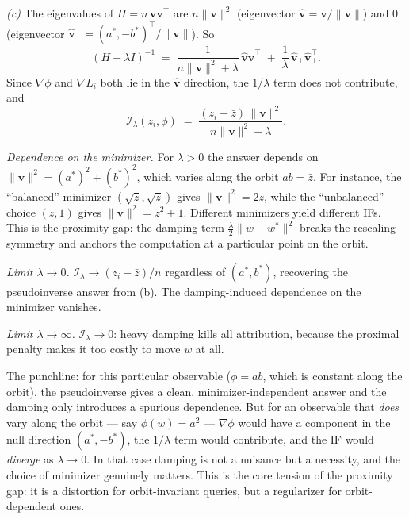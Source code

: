\begin{solution}[ex:if-degenerate]
\textit{(c)} The eigenvalues of $H = n\,\mathbf{v}\mathbf{v}^\top$ are $n\|\mathbf{v}\|^2$ (eigenvector $\hat{\mathbf{v}} = \mathbf{v}/\|\mathbf{v}\|$) and $0$ (eigenvector $\hat{\mathbf{v}}_\perp = (a^*,-b^*)^\top/\|\mathbf{v}\|$). So
\[
  (H+\lambda I)^{-1}
  \;=\; \frac{1}{n\|\mathbf{v}\|^2+\lambda}\,\hat{\mathbf{v}}\hat{\mathbf{v}}^\top
  \;+\; \frac{1}{\lambda}\,\hat{\mathbf{v}}_\perp\hat{\mathbf{v}}_\perp^\top.
\]
Since $\nabla\phi$ and $\nabla L_i$ both lie in the $\hat{\mathbf{v}}$ direction, the $1/\lambda$ term does not contribute, and
\[
  \mathcal{I}_\lambda(z_i,\phi) \;=\; \frac{(z_i-\bar z)\,\|\mathbf{v}\|^2}{n\|\mathbf{v}\|^2 + \lambda}.
\]

\emph{Dependence on the minimizer.} For $\lambda > 0$ the answer depends on $\|\mathbf{v}\|^2 = (a^*)^2 + (b^*)^2$, which varies along the orbit $ab = \bar z$. For instance, the ``balanced'' minimizer $(\sqrt{\bar z},\sqrt{\bar z})$ gives $\|\mathbf{v}\|^2 = 2\bar z$, while the ``unbalanced'' choice $(\bar z,1)$ gives $\|\mathbf{v}\|^2 = \bar z^2 + 1$. Different minimizers yield different IFs. This is the proximity gap: the damping term $\tfrac\lambda2\|w-w^*\|^2$ breaks the rescaling symmetry and anchors the computation at a particular point on the orbit.

\emph{Limit $\lambda\to 0$.} $\mathcal{I}_\lambda \to (z_i-\bar z)/n$ regardless of $(a^*,b^*)$, recovering the pseudoinverse answer from (b). The damping-induced dependence on the minimizer vanishes.

\emph{Limit $\lambda\to\infty$.} $\mathcal{I}_\lambda \to 0$: heavy damping kills all attribution, because the proximal penalty makes it too costly to move $w$ at all.

The punchline: for this particular observable ($\phi = ab$, which is constant along the orbit), the pseudoinverse gives a clean, minimizer-independent answer and the damping only introduces a spurious dependence. But for an observable that \emph{does} vary along the orbit --- say $\phi(w) = a^2$ --- $\nabla\phi$ would have a component in the null direction $(a^*,-b^*)$, the $1/\lambda$ term would contribute, and the IF would \emph{diverge} as $\lambda\to 0$. In that case damping is not a nuisance but a necessity, and the choice of minimizer genuinely matters. This is the core tension of the proximity gap: it is a distortion for orbit-invariant queries, but a regularizer for orbit-dependent ones.

\end{solution}

